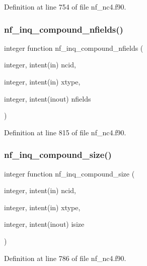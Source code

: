 Definition at line 754 of file nf\+\_\+nc4.\+f90.

\mbox{\label{nf__nc4_8f90_ac8a9472c6942ef71d2dfde75617b5e64}} 
\subsubsection{\texorpdfstring{nf\+\_\+inq\+\_\+compound\+\_\+nfields()}{nf\_inq\_compound\_nfields()}}
{\footnotesize\ttfamily integer function nf\+\_\+inq\+\_\+compound\+\_\+nfields (\begin{DoxyParamCaption}\item[{integer, intent(in)}]{ncid,  }\item[{integer, intent(in)}]{xtype,  }\item[{integer, intent(inout)}]{nfields }\end{DoxyParamCaption})}



Definition at line 815 of file nf\+\_\+nc4.\+f90.

\mbox{\label{nf__nc4_8f90_a4ef47b1d6bdc7c0ed2bc8129c89b3158}} 
\subsubsection{\texorpdfstring{nf\+\_\+inq\+\_\+compound\+\_\+size()}{nf\_inq\_compound\_size()}}
{\footnotesize\ttfamily integer function nf\+\_\+inq\+\_\+compound\+\_\+size (\begin{DoxyParamCaption}\item[{integer, intent(in)}]{ncid,  }\item[{integer, intent(in)}]{xtype,  }\item[{integer, intent(inout)}]{isize }\end{DoxyParamCaption})}



Definition at line 786 of file nf\+\_\+nc4.\+f90.

\mbox{\label{nf__nc4_8f90_ad3c1bd2f25f137de75f492091d41eedf}} 
